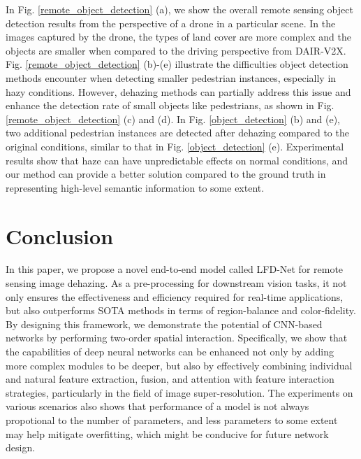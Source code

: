 \documentclass[lettersize,journal]{IEEEtran}
\begin{document}
In Fig. \ref{remote_object_detection} (a), we show the overall remote sensing object detection results from the perspective of a drone in a particular scene. In the images captured by the drone, the types of land cover are more complex and the objects are smaller when compared to the driving perspective from DAIR-V2X. Fig. \ref{remote_object_detection} (b)-(e) illustrate the difficulties object detection methods encounter when detecting smaller pedestrian instances, especially in hazy conditions. However, dehazing methods can partially address this issue and enhance the detection rate of small objects like pedestrians, as shown in Fig. \ref{remote_object_detection} (c) and (d). In Fig. \ref{object_detection} (b) and (e), two additional pedestrian instances are detected after dehazing compared to the original conditions, similar to that in Fig. \ref{object_detection} (e). Experimental results show that haze can have unpredictable effects on normal conditions, and our method can provide a better solution compared to the ground truth in representing high-level semantic information to some extent.


\section{Conclusion}
In this paper, we propose a novel end-to-end model called LFD-Net for remote sensing image dehazing. As a pre-processing for downstream vision tasks, it not only ensures the effectiveness and efficiency required for real-time applications, but also outperforms SOTA methods in terms of region-balance and color-fidelity. By designing this framework, we demonstrate the potential of CNN-based networks by performing two-order spatial interaction. Specifically, we show that the capabilities of deep neural networks can be enhanced not only by adding more complex modules to be deeper, but also by effectively combining individual and natural feature extraction, fusion, and attention with feature interaction strategies, particularly in the field of image super-resolution. The experiments on various scenarios also shows that performance of a model is not always propotional to the number of parameters, and less parameters to some extent may help mitigate overfitting, which might be conducive for future network design.
\end{document}
